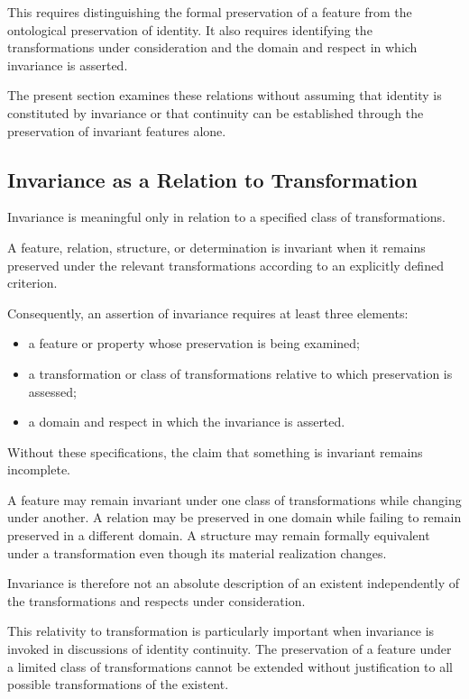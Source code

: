 This requires distinguishing the formal preservation
of a feature from the ontological preservation of
identity. It also requires identifying the transformations
under consideration and the domain and respect in which
invariance is asserted.

The present section examines these relations without
assuming that identity is constituted by invariance
or that continuity can be established through the
preservation of invariant features alone.

\subsection{Invariance as a Relation to Transformation}

Invariance is meaningful only in relation to a specified
class of transformations.

A feature, relation, structure, or determination is
invariant when it remains preserved under the relevant
transformations according to an explicitly defined
criterion.

Consequently, an assertion of invariance requires
at least three elements:

\begin{itemize}
    \item a feature or property whose preservation
    is being examined;
    \item a transformation or class of transformations
    relative to which preservation is assessed;
    \item a domain and respect in which the invariance
    is asserted.
\end{itemize}

Without these specifications, the claim that something
is invariant remains incomplete.

A feature may remain invariant under one class of
transformations while changing under another. A relation
may be preserved in one domain while failing to remain
preserved in a different domain. A structure may remain
formally equivalent under a transformation even though
its material realization changes.

Invariance is therefore not an absolute description
of an existent independently of the transformations
and respects under consideration.

This relativity to transformation is particularly
important when invariance is invoked in discussions
of identity continuity. The preservation of a feature
under a limited class of transformations cannot be
extended without justification to all possible
transformations of the existent.

